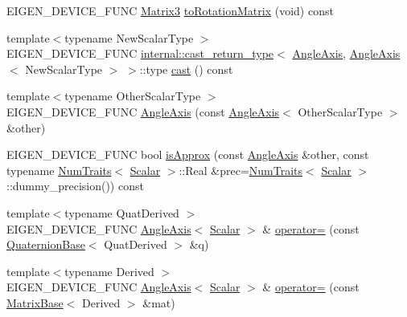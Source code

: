 \begin{DoxyCompactItemize}
\item 
E\+I\+G\+E\+N\+\_\+\+D\+E\+V\+I\+C\+E\+\_\+\+F\+U\+NC \mbox{\hyperlink{class_eigen_1_1_matrix}{Matrix3}} \mbox{\hyperlink{class_eigen_1_1_angle_axis_a750ae6694e576bc6c49b635b56ef5306}{to\+Rotation\+Matrix}} (void) const
\item 
{\footnotesize template$<$typename New\+Scalar\+Type $>$ }\\E\+I\+G\+E\+N\+\_\+\+D\+E\+V\+I\+C\+E\+\_\+\+F\+U\+NC \mbox{\hyperlink{struct_eigen_1_1internal_1_1cast__return__type}{internal\+::cast\+\_\+return\+\_\+type}}$<$ \mbox{\hyperlink{class_eigen_1_1_angle_axis}{Angle\+Axis}}, \mbox{\hyperlink{class_eigen_1_1_angle_axis}{Angle\+Axis}}$<$ New\+Scalar\+Type $>$ $>$\+::type \mbox{\hyperlink{class_eigen_1_1_angle_axis_a4baeb843025af6b4ce76e9a29cc08988}{cast}} () const
\item 
{\footnotesize template$<$typename Other\+Scalar\+Type $>$ }\\E\+I\+G\+E\+N\+\_\+\+D\+E\+V\+I\+C\+E\+\_\+\+F\+U\+NC \mbox{\hyperlink{class_eigen_1_1_angle_axis_a5cc9091af03beb618eb16ee5f910f067}{Angle\+Axis}} (const \mbox{\hyperlink{class_eigen_1_1_angle_axis}{Angle\+Axis}}$<$ Other\+Scalar\+Type $>$ \&other)
\item 
E\+I\+G\+E\+N\+\_\+\+D\+E\+V\+I\+C\+E\+\_\+\+F\+U\+NC bool \mbox{\hyperlink{class_eigen_1_1_angle_axis_a3f219c579dbdce81add9299b8d3938ae}{is\+Approx}} (const \mbox{\hyperlink{class_eigen_1_1_angle_axis}{Angle\+Axis}} \&other, const typename \mbox{\hyperlink{struct_eigen_1_1_num_traits}{Num\+Traits}}$<$ \mbox{\hyperlink{class_eigen_1_1_angle_axis_acd9b10692d7d726b28670e4d3a282fe8}{Scalar}} $>$\+::Real \&prec=\mbox{\hyperlink{struct_eigen_1_1_num_traits}{Num\+Traits}}$<$ \mbox{\hyperlink{class_eigen_1_1_angle_axis_acd9b10692d7d726b28670e4d3a282fe8}{Scalar}} $>$\+::dummy\+\_\+precision()) const
\item 
{\footnotesize template$<$typename Quat\+Derived $>$ }\\E\+I\+G\+E\+N\+\_\+\+D\+E\+V\+I\+C\+E\+\_\+\+F\+U\+NC \mbox{\hyperlink{class_eigen_1_1_angle_axis}{Angle\+Axis}}$<$ \mbox{\hyperlink{class_eigen_1_1_angle_axis_acd9b10692d7d726b28670e4d3a282fe8}{Scalar}} $>$ \& \mbox{\hyperlink{class_eigen_1_1_angle_axis_aff838a6d260ae70bd7b8ff452dfbdfb6}{operator=}} (const \mbox{\hyperlink{class_eigen_1_1_quaternion_base}{Quaternion\+Base}}$<$ Quat\+Derived $>$ \&q)
\item 
{\footnotesize template$<$typename Derived $>$ }\\E\+I\+G\+E\+N\+\_\+\+D\+E\+V\+I\+C\+E\+\_\+\+F\+U\+NC \mbox{\hyperlink{class_eigen_1_1_angle_axis}{Angle\+Axis}}$<$ \mbox{\hyperlink{class_eigen_1_1_angle_axis_acd9b10692d7d726b28670e4d3a282fe8}{Scalar}} $>$ \& \mbox{\hyperlink{class_eigen_1_1_angle_axis_ad37b53edddcbd45437999ce9e465ab90}{operator=}} (const \mbox{\hyperlink{class_eigen_1_1_matrix_base}{Matrix\+Base}}$<$ Derived $>$ \&mat)

\end{DoxyCompactItemize}
